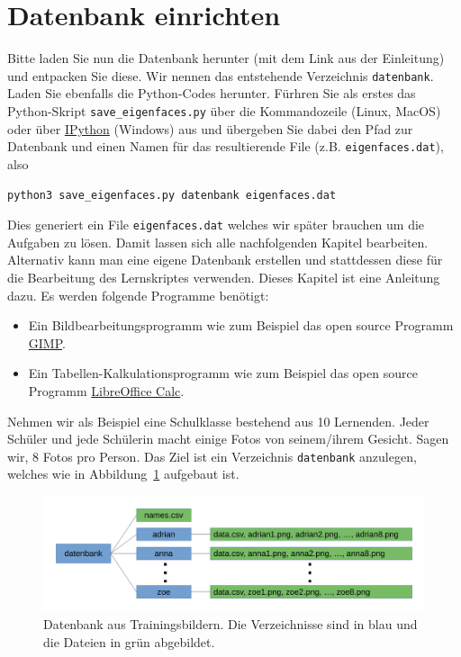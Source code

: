 \section{Datenbank einrichten} \label{sec:database}
Bitte laden Sie nun die Datenbank herunter (mit dem Link aus der Einleitung) und entpacken Sie diese.
Wir nennen das entstehende Verzeichnis \texttt{datenbank}.
Laden Sie ebenfalls die Python-Codes herunter.
Fürhren Sie als erstes das Python-Skript \texttt{save\_eigenfaces.py} über die Kommandozeile (Linux, MacOS) oder über \href{https://ipython.org/install.html}{IPython} (Windows) aus und übergeben Sie dabei den Pfad zur Datenbank und einen Namen für das resultierende File (z.B. \texttt{eigenfaces.dat}), also
\begin{center}
	\texttt{python3 save\_eigenfaces.py datenbank eigenfaces.dat}
\end{center}
Dies generiert ein File \texttt{eigenfaces.dat} welches wir später brauchen um die Aufgaben zu lösen.
Damit lassen sich alle nachfolgenden Kapitel bearbeiten.
Alternativ kann man eine eigene Datenbank erstellen und stattdessen diese für die Bearbeitung des Lernskriptes verwenden.
Dieses Kapitel ist eine Anleitung dazu.
Es werden folgende Programme benötigt:
\begin{itemize}
	\item Ein Bildbearbeitungsprogramm wie zum Beispiel das open source Programm \href{https://www.gimp.org/}{GIMP}.
	\item Ein Tabellen-Kalkulationsprogramm wie zum Beispiel das open source Programm \href{https://de.libreoffice.org/discover/calc/}{LibreOffice Calc}.
\end{itemize}
Nehmen wir als Beispiel eine Schulklasse bestehend aus 10 Lernenden.
Jeder Schüler und jede Schülerin macht einige Fotos von seinem/ihrem Gesicht.
Sagen wir, 8 Fotos pro Person.
Das Ziel ist ein Verzeichnis \texttt{datenbank} anzulegen, welches wie in Abbildung~\ref{fig:database} aufgebaut ist.
\begin{figure}[ht]
	\centering
	\includegraphics[width=\textwidth]{images/database}
	\caption{Datenbank aus Trainingsbildern. Die Verzeichnisse sind in blau und die Dateien in grün abgebildet.}
	\label{fig:database}
\end{figure}

